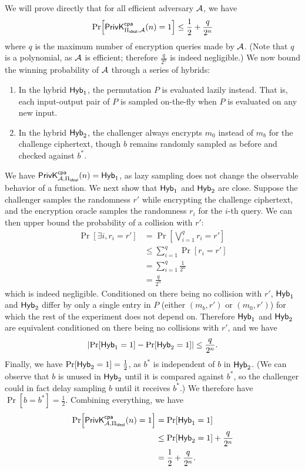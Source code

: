 \documentclass{article}
\theoremstyle{definition}
\begin{document}
We will prove directly that for all efficient adversary $\mathcal{A}$, we have $$\Pr[\mathsf{PrivK}^{\mathsf{cpa}}_{\Pi_{\mathsf{ideal}}, \mathcal{A}}(n)=1]\leq \frac{1}{2}+\frac{q}{2^n}$$
where $q$ is the maximum number of encryption queries made by $\mathcal{A}$.
(Note that $q$ is a polynomial, as $\mathcal{A}$ is efficient; therefore $\frac{q}{2^n}$ is indeed negligible.)
We now bound the winning probability of $\mathcal{A}$ through a series of hybrids:
\begin{enumerate}
    \item In the hybrid $\mathsf{Hyb}_1$, the permutation $P$ is evaluated lazily instead.
    That is, each input-output pair of $P$ is sampled on-the-fly when $P$ is evaluated on any new input.
    \item In the hybrid $\mathsf{Hyb}_2$, the challenger always encrypts $m_0$ instead of $m_b$ for the challenge ciphertext, though $b$ remains randomly sampled as before and checked against $b^*$.
\end{enumerate}
We have $\mathsf{PrivK}^{\mathsf{cpa}}_{\mathcal{A}, \Pi_{\mathsf{ideal}}}(n)=\mathsf{Hyb}_1$, as lazy sampling does not change the observable behavior of a function.
We next show that $\mathsf{Hyb}_1$ and $\mathsf{Hyb}_2$ are close.
Suppose the challenger samples the randomness $r'$ while encrypting the challenge ciphertext, and the encryption oracle samples the randomness $r_i$ for the $i$-th query.
We can then upper bound the probability of a collision with $r'$:
\begin{align*}
    \Pr[\exists i, r_i=r'] &= \Pr[\bigvee_{i=1}^q r_i=r'] \\
    &\leq \sum_{i=1}^q \Pr[r_i=r'] \\
    &=\sum_{i=1}^q\frac{1}{2^n} \\
    &=\frac{q}{2^n}
\end{align*}
which is indeed negligible.
Conditioned on there being no collision with $r'$,
$\mathsf{Hyb}_1$ and $\mathsf{Hyb}_2$ differ by only a single entry in $P$ (either $(m_b, r')$ or $(m_0, r')$) for which the rest of the experiment does not depend on.
Therefore $\mathsf{Hyb}_1$ and $\mathsf{Hyb}_2$ are equivalent conditioned on there being no collisions with $r'$, and we have
$$\abs{\Pr[\mathsf{Hyb}_1=1]-\Pr[\mathsf{Hyb}_2=1]}\leq \frac{q}{2^n}.$$
Finally, we have $\Pr[\mathsf{Hyb}_2=1]=\frac{1}{2}$, as $b^*$ is independent of $b$ in $\mathsf{Hyb}_2$.
(We can observe that $b$ is unused in $\mathsf{Hyb}_2$ until it is compared against $b^*$, so the challenger could in fact delay sampling $b$ until it receives $b^*$.)
We therefore have $\Pr[b=b^*]=\frac{1}{2}$.
Combining everything, we have
\begin{align*}
    \Pr[\mathsf{PrivK}^{\mathsf{cpa}}_{\mathcal{A}, \Pi_{\mathsf{ideal}}}(n)=1] &= \Pr[\mathsf{Hyb}_1=1] \\
    &\leq \Pr[\mathsf{Hyb}_2=1] + \frac{q}{2^n} \\
    &=\frac{1}{2}+\frac{q}{2^n}.
\end{align*}
\end{document}
